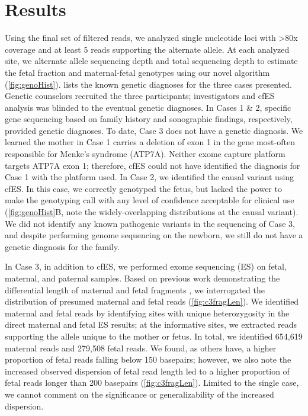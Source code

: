 \documentclass{article}\usepackage[]{graphicx}\usepackage[]{color}
\begin{document}
\section{Results}

Using the final set of filtered reads, we analyzed single nucleotide loci with >80x coverage and at least 5 reads supporting the alternate allele.
At each analyzed site, we alternate allele sequencing depth and total sequencing depth to estimate the fetal fraction and maternal-fetal genotypes using our novel algorithm (\cref{fig:genoHist}).
 lists the known genetic diagnoses for the three cases presented.
Genetic counselors recruited the three participants; investigators and cfES analysis was blinded to the eventual genetic diagnoses.
In Cases 1 \& 2, specific gene sequencing based on family history and sonographic findings, respectively, provided genetic diagnoses.
To date, Case 3 does not have a genetic diagnosis.
We learned the mother in Case 1 carries a deletion of exon 1 in the gene most-often responsible for Menke’s syndrome (ATP7A).
Neither exome capture platform targets ATP7A exon 1; therefore, cfES could not have identified the diagnosis for Case 1 with the platform used.
In Case 2, we identified the causal variant using cfES.
In this case, we correctly genotyped the fetus, but lacked the power to make the genotyping call with any level of confidence acceptable for clinical use (\cref{fig:genoHist}B, note the widely-overlapping distributions at the causal variant).
We did not identify any known pathogenic variants in the sequencing of Case 3, and despite performing genome sequencing on the newborn, we still do not have a genetic diagnosis for the family.

In Case 3, in addition to cfES, we performed exome sequencing (ES) on fetal, maternal, and paternal samples.
Based on previous work demonstrating the differential length of maternal and fetal fragments \cite{chan:2004aa,chan:2016aa,jiang:2016ab,rabinowitz:2019aa}, we interrogated the distribution of presumed maternal and fetal reads (\cref{fig:c3fragLen}).
We identified maternal and fetal reads by identifying sites with unique heterozygosity in the direct maternal and fetal ES results; at the informative sites, we extracted reads supporting the allele unique to the mother or fetus.
In total, we identified 654,619 maternal reads and 279,508 fetal reads.
We found, as others have, a higher proportion of fetal reads falling below 150 basepairs; however, we also note the increased observed dispersion of fetal read length led to a higher proportion of fetal reads longer than 200 basepairs (\cref{fig:c3fragLen}).
Limited to the single case, we cannot comment on the significance or generalizability of the increased dispersion.
\end{document}
